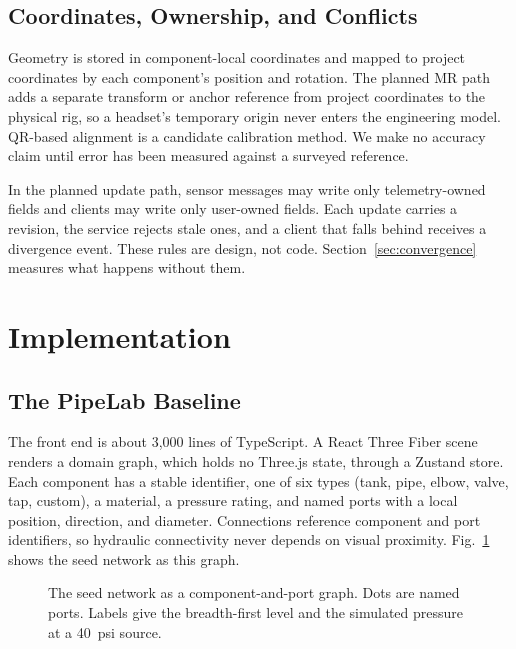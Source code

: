 \documentclass[conference]{IEEEtran}
\newcommand{\pressTank}{40}
\newcommand{\pressPipeA}{38}
\newcommand{\pressValve}{38}
\newcommand{\pressPipeB}{34}
\newcommand{\pressTap}{38}
\begin{document}
\subsection{Coordinates, Ownership, and Conflicts}
Geometry is stored in component-local coordinates and mapped to project coordinates by each component's position and rotation. The planned MR path adds a separate transform or anchor reference from project coordinates to the physical rig, so a headset's temporary origin never enters the engineering model. QR-based alignment is a candidate calibration method. We make no accuracy claim until error has been measured against a surveyed reference.

In the planned update path, sensor messages may write only telemetry-owned fields and clients may write only user-owned fields. Each update carries a revision, the service rejects stale ones, and a client that falls behind receives a divergence event. These rules are design, not code. Section~\ref{sec:convergence} measures what happens without them.

\section{Implementation}
\subsection{The PipeLab Baseline}
The front end is about 3,000 lines of TypeScript. A React Three Fiber scene renders a domain graph, which holds no Three.js state, through a Zustand store. Each component has a stable identifier, one of six types (tank, pipe, elbow, valve, tap, custom), a material, a pressure rating, and named ports with a local position, direction, and diameter. Connections reference component and port identifiers, so hydraulic connectivity never depends on visual proximity. Fig.~\ref{fig:graph} shows the seed network as this graph.

\begin{figure}[t]
\centering
{}
\caption{The seed network as a component-and-port graph. Dots are named ports. Labels give the breadth-first level and the simulated pressure at a 40~psi source.}
\label{fig:graph}
\end{figure}
\end{document}
